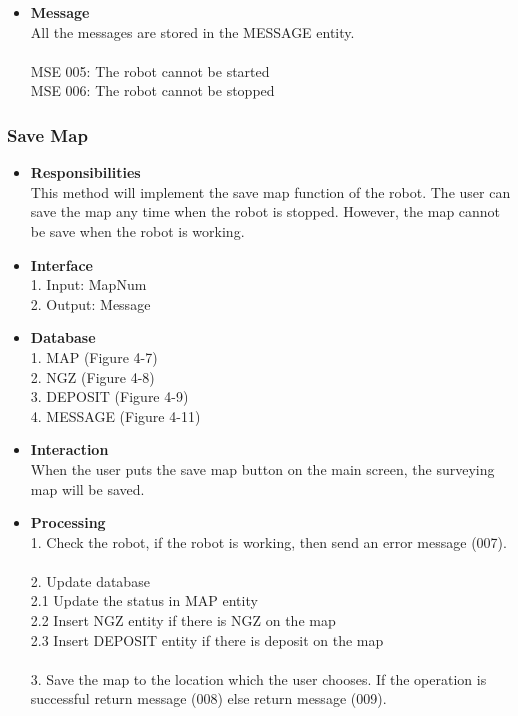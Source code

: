 \documentclass[11pt, a4paper]{article}
\begin{document}
\begin{itemize}
\item {\bfseries Message }\\
All the messages are stored in the MESSAGE entity.\\
\\
MSE 005: The robot cannot be started\\
MSE 006: The robot cannot be stopped\\
\end{itemize}

\subsubsection{Save Map }
\begin{itemize}
\item {\bfseries Responsibilities }\\
This method will implement the save map function of the robot. The user can save the map any time when the robot is stopped. However, the map cannot be save when the robot is working.

\item {\bfseries Interface }\\
1. Input: MapNum\\
2. Output: Message\\

\item {\bfseries Database }\\
1. MAP (Figure 4-7)\\
2. NGZ (Figure 4-8)\\
3. DEPOSIT (Figure 4-9)\\
4. MESSAGE (Figure 4-11)\\

\item {\bfseries Interaction }\\
When the user puts the save map button on the main screen, the surveying map will be saved.\\

\item {\bfseries Processing }\\
1. Check the robot, if the robot is working, then send an error message (007).\\
\\
2. Update database\\
2.1 Update the status in MAP entity\\
2.2 Insert NGZ entity if there is NGZ on the map\\
2.3 Insert DEPOSIT entity if there is deposit on the map\\
\\
3. Save the map to the location which the user chooses. If the operation is successful return message (008) else return message (009).\\


\end{itemize}
\end{document}
